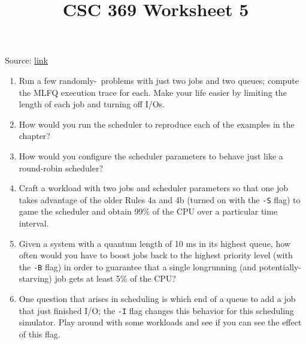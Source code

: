 \documentclass[12pt]{article}
\begin{document}
\title{CSC 369 Worksheet 5}
\maketitle

\bigskip

Source: \href{http://pages.cs.wisc.edu/~remzi/Classes/537/Spring2018/Book/cpu-sched-mlfq.pdf}{link}

\bigskip

\begin{enumerate}[1.]
    \item Run a few randomly-\ problems with just two jobs and
    two queues; compute the MLFQ execution trace for each. Make
    your life easier by limiting the length of each job and turning off I/Os.
    \item How would you run the scheduler to reproduce each of the examples in the chapter?
    \item How would you configure the scheduler parameters to behave just
    like a round-robin scheduler?
    \item Craft a workload with two jobs and scheduler parameters so that
    one job takes advantage of the older Rules 4a and 4b (turned on
    with the \texttt{-S} flag) to game the scheduler and obtain 99\% of the CPU
    over a particular time interval.
    \item Given a system with a quantum length of 10 ms in its highest queue,
    how often would you have to boost jobs back to the highest priority
    level (with the \texttt{-B} flag) in order to guarantee that a single longrunning (and potentially-starving) job gets at least 5\% of the CPU?
    \item One question that arises in scheduling is which end of a queue to
    add a job that just finished I/O; the \texttt{-I} flag changes this behavior
    for this scheduling simulator. Play around with some workloads
    and see if you can see the effect of this flag.
\end{enumerate}
\end{document}
